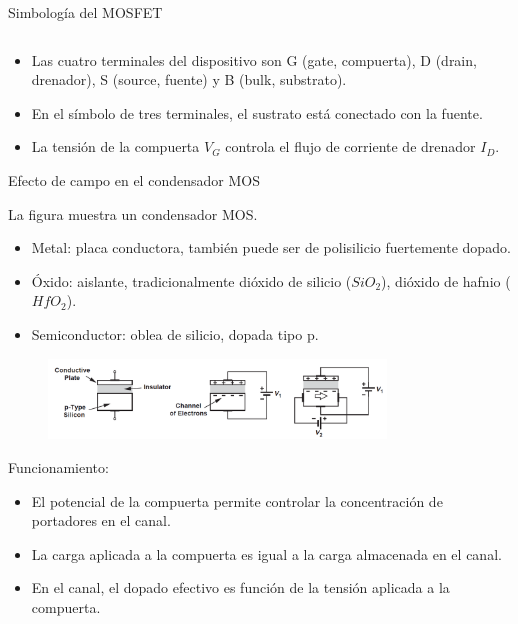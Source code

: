 \documentclass[t,aspectratio=169,10pt]{beamer}
\begin{document}
\begin{frame}{Simbología del MOSFET}
\begin{columns}
\begin{column}{0.5\textwidth}
        \end{column}
 
\end{columns}

\vspace{5mm}
\begin{itemize}
    \item Las cuatro terminales del dispositivo son G (gate, compuerta), D (drain, drenador), S (source, fuente) y B (bulk, substrato).
    \item En el símbolo de tres terminales, el sustrato está conectado con la fuente.
    \item La tensión de la compuerta $V_G$ controla el flujo de corriente de drenador $I_D$.
\end{itemize}

\end{frame}


\begin{frame}{Efecto de campo en el condensador MOS}

La figura muestra un condensador MOS.

\begin{itemize}
    \item Metal: placa conductora, también puede ser de polisilicio fuertemente dopado.
    \item Óxido: aislante, tradicionalmente dióxido de silicio ($SiO_2$), dióxido de hafnio ($HfO_2$).
    \item Semiconductor: oblea de silicio, dopada tipo p.
\end{itemize}

\begin{figure}[H]
    \centering
    \includegraphics[width=0.8\textwidth]{figuras/condensador_mos.png}
\end{figure}

Funcionamiento:

\begin{itemize}
    \item El potencial de la compuerta permite controlar la concentración de portadores en el canal.
    \item La carga aplicada a la compuerta es igual a la carga almacenada en el canal.
    \item En el canal, el dopado efectivo es función de la tensión aplicada a la compuerta.
\end{itemize}
    
\end{frame}
\end{document}
